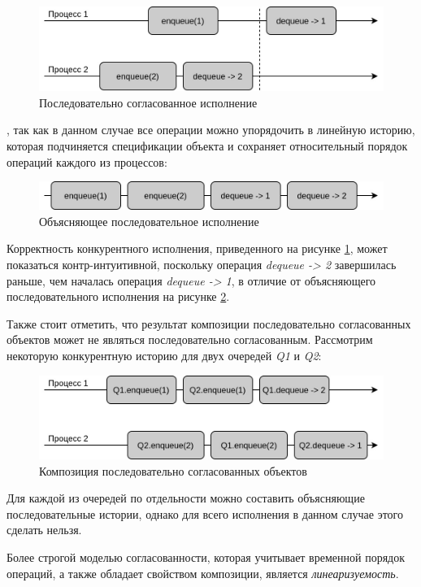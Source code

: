 \documentclass[14pt, openany]{book}
\begin{document}
\begin{figure}[h]
\caption{Последовательно согласованное исполнение}
\label{fig:sequential}
\vspace{2mm}
\centering
\includegraphics[scale=0.4]{Sequential.jpg}
\end{figure}
, так как в данном случае все операции можно упорядочить в линейную историю, которая подчиняется спецификации объекта и сохраняет относительный порядок операций каждого из процессов:
\begin{figure}[h]
\caption{Объясняющее последовательное исполнение}
\label{fig:sequentialExpl}
\vspace{2mm}
\centering
\includegraphics[scale=0.4]{SequentialExpl.jpg}
\end{figure}

Корректность конкурентного исполнения, приведенного на рисунке \ref{fig:sequential}, может показаться контр-интуитивной, поскольку операция \textit{dequeue -> 2} завершилась раньше, чем началась операция \textit{dequeue -> 1}, в отличие от объясняющего последовательного исполнения на рисунке \ref{fig:sequentialExpl}. \par
Также стоит отметить, что результат композиции последовательно согласованных объектов может не являться последовательно согласованным. Рассмотрим некоторую конкурентную историю для двух очередей \textit{Q1} и \textit{Q2}:

\begin{figure}[h]
\caption{Композиция последовательно согласованных объектов}
\vspace{2mm}
\centering
\includegraphics[scale=0.4]{SequentialComp.jpg}
\end{figure}
\noindent Для каждой из очередей по отдельности можно составить объясняющие последовательные истории, однако для всего исполнения в данном случае этого сделать нельзя. \par
Более строгой моделью согласованности, которая учитывает временной порядок операций, а также обладает свойством композиции, является \textit{линеаризуемость}. 
\end{document}
